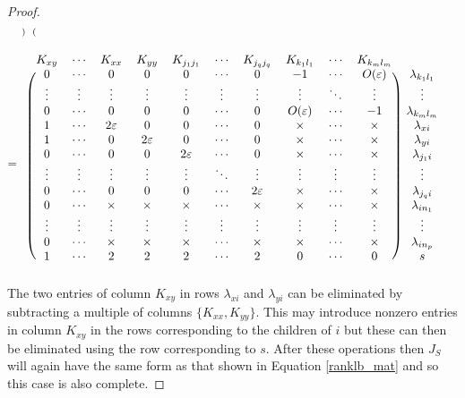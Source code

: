 \documentclass[12pt,reqno]{amsart}
\theoremstyle{plain}
\theoremstyle{definition}
\begin{document}
\begin{proof}
\begin{align*}
\begin{scriptsize}
\begin{blockarray}{ccccccccccc}
\begin{block}{(cccccccccc)c}
\end{block}
\end{blockarray}
\end{scriptsize}
\\
=\quad
&\begin{blockarray}{ccccccccccc}
K_{xy} &\cdots & K_{xx} & K_{yy} & K_{j_{1}j_{1}} & \cdots & K_{j_{q}j_{q}} & K_{k_{1}l_{1}} & \cdots & K_{k_{m}l_{m}}\\
\begin{block}{(cccccccccc)c}
  0 & \cdots & 0 & 0 & 0 & \cdots & 0 & -1 &\cdots & O(\varepsilon) & \lambda_{k_1 l_1} \\
  \vdots & \vdots & \vdots & \vdots & \vdots & \vdots & \vdots & \vdots &\ddots &\vdots  & \vdots\\
  0 & \cdots & 0 & 0 & 0 & \cdots & 0 & O(\varepsilon) & \cdots &-1 & \lambda_{k_m l_m} \\
  1 & \cdots & 2\varepsilon & 0 & 0 & \cdots & 0 & \times & \cdots &\times & \lambda_{x i}\\
  1 & \cdots & 0 & 2\varepsilon & 0 & \cdots & 0 & \times & \cdots &\times & \lambda_{y i}\\
  0 & \cdots & 0 & 0 & 2\varepsilon & \cdots & 0 & \times & \cdots &\times  & \lambda_{j_1 i}\\
  \vdots & \vdots & \vdots & \vdots & \vdots & \ddots & \vdots & \vdots & \vdots & \vdots & \vdots\\
  0 & \cdots & 0 & 0 & 0 & \cdots & 2\varepsilon & \times &\cdots &\times & \lambda_{j_q i} \\
  0 & \cdots & \times & \times & \times & \cdots & \times &\times & \cdots & \times &  \lambda_{i n_1}\\
  \vdots & \vdots & \vdots & \vdots & \vdots & \vdots & \vdots &\vdots & \vdots & \vdots & \vdots \\
  0 & \cdots & \times & \times & \times & \cdots & \times &\times & \cdots & \times  &  \lambda_{i n_p} \\
  1 & \cdots & 2 & 2 & 2 & \cdots & 2 & 0 & \cdots & 0 & s\\
\end{block}
\end{blockarray}
\end{align*}
The two entries of column $K_{xy}$ in rows $\lambda_{xi}$ and $\lambda_{yi}$ can be eliminated by subtracting a multiple of columns $\{K_{xx},K_{yy}\}$. This may introduce nonzero entries in column $K_{xy}$ in the rows corresponding to the children of $i$ but these can then be eliminated using the row corresponding to $s$. After these operations then $J_S$ will again have the same form as that shown in Equation \ref{ranklb_mat} and so this case is also complete. 
\end{proof}
\end{document}
